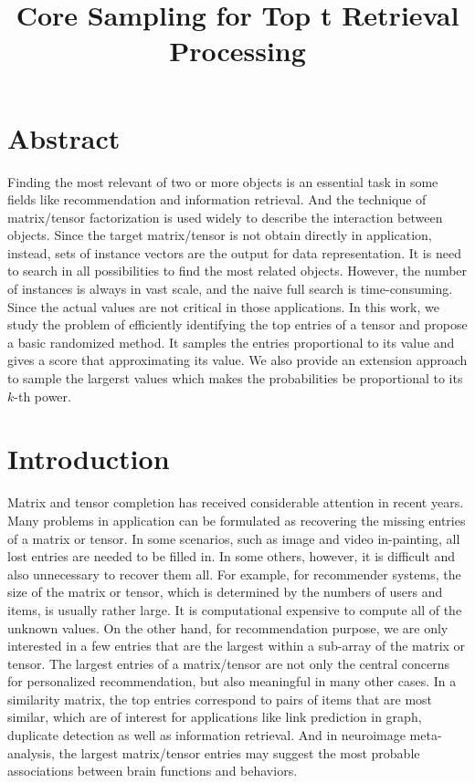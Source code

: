 \documentclass[letterpaper]{article}
\title{Core Sampling for Top t Retrieval Processing}
\begin{document}
\maketitle
\section{Abstract}
Finding the most relevant of two or more objects is an essential task
in some fields like recommendation and  information retrieval.
And the technique of matrix/tensor factorization is used widely to describe the 
interaction between objects.
Since the target matrix/tensor is not obtain directly in application, instead,
sets of instance vectors are the output for data representation.
It is need to search in all possibilities to find the most related objects.
However, the number of instances is always in vast scale, 
and the naive full search is time-consuming.
Since the actual values are not critical in those applications.
In this work, we study the problem of efficiently
identifying the top entries of a tensor and propose a basic randomized method.
It samples the entries proportional to its value and gives a score that
approximating its value. 
We also provide an extension approach to sample the largerst values  
which makes the probabilities be proportional to its $k$-th power.

\section{Introduction}
Matrix and tensor completion has received considerable attention in recent years. 
Many problems in application can be formulated as recovering the missing entries of a matrix or tensor. 
In some scenarios, such as image and video in-painting\cite{Ankita14}, 
all lost entries are needed to be filled in. 
In some others, however, it is difficult and also unnecessary to recover them all. 
For example, for recommender systems, the size of the matrix or tensor, 
which is determined by the numbers of users and items, is usually rather large. 
It is computational expensive to compute all of the unknown values. 
On the other hand, for recommendation purpose, 
we are only interested in a few entries that are the largest within a sub-array of the matrix or tensor. 
The largest entries of a matrix/tensor are not only the central concerns for personalized recommendation, 
but also meaningful in many other cases. 
In a similarity matrix, the top entries correspond to pairs of items that are most similar, 
which are of interest for applications like link prediction in graph\cite{LibenNowell07}, 
duplicate detection\cite{Ke2010} as well as information retrieval\cite{Salton03IR}. 
And in neuroimage meta-analysis, 
the largest matrix/tensor entries may suggest the most probable associations between brain functions and behaviors.
\end{document}
